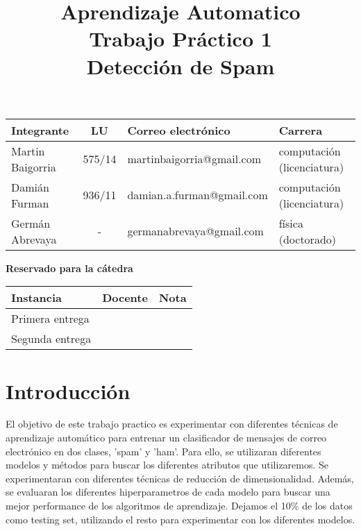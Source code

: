 \documentclass[10pt,a4paper]{article}
\title{Aprendizaje Automatico \\ Trabajo Práctico 1 \\ Detección de Spam }
\begin{document}

\maketitle

\bigskip

\begin{table}[h]
\centering
\begin{tabular}{|l l l l|}
\hline
Integrante       & \multicolumn{1}{c}{LU}     & Correo electrónico       	& Carrera \\ \hline
Martin Baigorria & \multicolumn{1}{c}{575/14} & martinbaigorria@gmail.com & computación (licenciatura) \\ 
Damián Furman & \multicolumn{1}{c}{936/11}& damian.a.furman@gmail.com & computación (licenciatura)\\
Germán Abrevaya & \multicolumn{1}{c}{-} & germanabrevaya@gmail.com & física (doctorado)\\ \hline
\end{tabular}
\end{table}

\vfill

\begin{center}
\textbf{Reservado para la cátedra}
\end{center}
\begin{table}[h]
\centering
\begin{tabular}{|l|l|l|}
\hline
Instancia       & Docente & Nota \\ \hline
Primera entrega &         &      \\ \hline
Segunda entrega &         &      \\ \hline
\end{tabular}
\end{table}

\newpage
\tableofcontents
\newpage


\section{Introducción}

El objetivo de este trabajo practico es experimentar con diferentes técnicas de aprendizaje automático para entrenar un clasificador de mensajes de correo electrónico en dos clases, 'spam' y 'ham'. Para ello, se utilizaran diferentes modelos y métodos para buscar los diferentes atributos que utilizaremos. Se experimentaran con diferentes técnicas de reducción de dimensionalidad. Además, se evaluaran los diferentes hiperparametros de cada modelo para buscar una mejor performance de los algoritmos de aprendizaje. Dejamos el 10\% de los datos como testing set, utilizando el resto para experimentar con los diferentes modelos.
\end{document}
